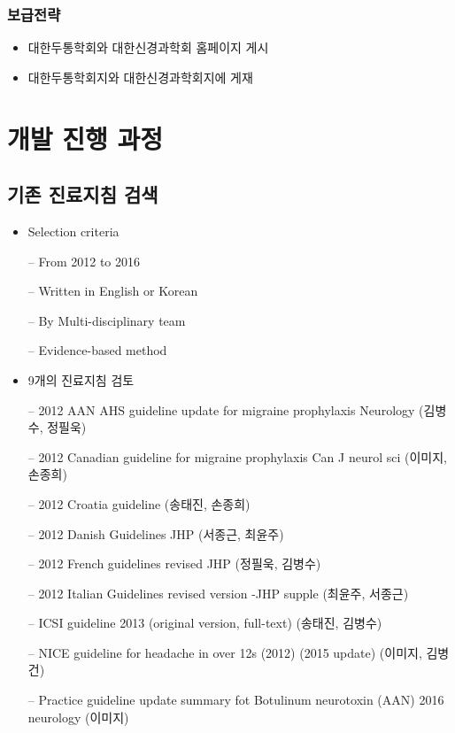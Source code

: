 \documentclass[]{book}
\providecommand{\tightlist}{%
  \setlength{\itemsep}{0pt}\setlength{\parskip}{0pt}}
\begin{document}
\hypertarget{section-39}{%
\subsection*{보급전략}\label{section-39}}

\begin{itemize}
\tightlist
\item
  대한두통학회와 대한신경과학회 홈페이지 게시
\item
  대한두통학회지와 대한신경과학회지에 게재
\end{itemize}

\hypertarget{section-40}{%
\chapter{개발 진행 과정}\label{section-40}}

\hypertarget{section-41}{%
\section*{기존 진료지침 검색}\label{section-41}}

\begin{itemize}
\item
  Selection criteria

  -- From 2012 to 2016

  -- Written in English or Korean

  -- By Multi-disciplinary team

  -- Evidence-based method
\item
  9개의 진료지침 검토

  -- 2012 AAN AHS guideline update for migraine prophylaxis Neurology (김병수, 정필욱)

  -- 2012 Canadian guideline for migraine prophylaxis Can J neurol sci (이미지, 손종희)

  -- 2012 Croatia guideline (송태진, 손종희)

  -- 2012 Danish Guidelines JHP (서종근, 최윤주)

  -- 2012 French guidelines revised JHP (정필욱, 김병수)

  -- 2012 Italian Guidelines revised version -JHP supple (최윤주, 서종근)

  -- ICSI guideline 2013 (original version, full-text) (송태진, 김병수)

  -- NICE guideline for headache in over 12s (2012) (2015 update) (이미지, 김병건)

  -- Practice guideline update summary fot Botulinum neurotoxin (AAN) 2016 neurology (이미지)
\end{itemize}
\end{document}
